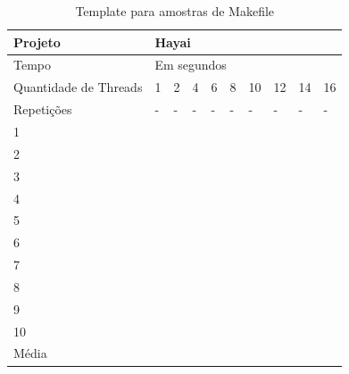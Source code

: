 \begin{table}[h]
\centering
\begin{tabular}{|p{1cm}|p{1.4cm}|p{1.4cm}|p{1.4cm}|p{1.4cm}|p{1.4cm}|p{1.4cm}|p{1.4cm}|p{1.4cm}|p{1.4cm}|}
\hline
Projeto               & \multicolumn{9}{l|}{Hayai}        \\ \hline
Tempo                 & \multicolumn{9}{l|}{Em segundos}      \\ \hline
Quantidade de Threads & 1 & 2 & 4 & 6 & 8 & 10 & 12 & 14 & 16 \\ \hline
Repetições            & - & - & - & - & - & -  & -  & -  & -  \\ \hline
1 &  &  &  &  &  &  &  &  &  \\ \hline
2 &  &  &  &  &  &  &  &  &  \\ \hline
3 &  &  &  &  &  &  &  &  &  \\ \hline
4 &  &  &  &  &  &  &  &  &  \\ \hline
5 &  &  &  &  &  &  &  &  &  \\ \hline
6 &  &  &  &  &  &  &  &  &  \\ \hline
7 &  &  &  &  &  &  &  &  &  \\ \hline
8 &  &  &  &  &  &  &  &  &  \\ \hline
9 &  &  &  &  &  &  &  &  &  \\ \hline
10 &  &  &  &  &  &  &  &  &  \\ \hline
Média &  &  &  &  &  &  &  &  &  \\ \hline
\end{tabular}
\caption{Template para amostras de Makefile}
\label{tab:makefile}
\end{table}


